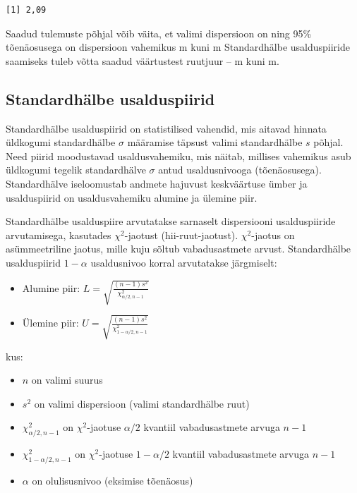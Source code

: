 \documentclass[
]{book}
\providecommand{\tightlist}{%
  \setlength{\itemsep}{0pt}\setlength{\parskip}{0pt}}
\theoremstyle{definition}
\theoremstyle{definition}
\theoremstyle{definition}
\theoremstyle{definition}
\theoremstyle{remark}
\begin{document}
\begin{verbatim}
[1] 2,09
\end{verbatim}

Saadud tulemuste põhjal võib väita, et valimi dispersioon on  ning 95\% tõenäosusega on dispersioon
vahemikus  m kuni  m Standardhälbe usalduspiiride saamiseks tuleb võtta saadud väärtustest ruutjuur --  m kuni  m.

\subsection{Standardhälbe usalduspiirid}\label{standardhuxe4lbe-usalduspiirid}

Standardhälbe usalduspiirid on statistilised vahendid, mis aitavad hinnata üldkogumi standardhälbe \(\sigma\) määramise täpsust valimi standardhälbe \(s\) põhjal. Need piirid moodustavad usaldusvahemiku, mis näitab, millises vahemikus asub üldkogumi tegelik standardhälve \(\sigma\) antud usaldusnivooga (tõenäosusega). Standardhälve iseloomustab andmete hajuvust keskväärtuse ümber ja usalduspiirid on usaldusvahemiku alumine ja ülemine piir.

Standardhälbe usalduspiire arvutatakse sarnaselt dispersiooni usalduspiiride arvutamisega, kasutades \(\chi^2\)-jaotust (hii-ruut-jaotust). \(\chi^2\)-jaotus on asümmeetriline jaotus, mille kuju sõltub vabadusastmete arvust. Standardhälbe usalduspiirid \(1-\alpha\) usaldusnivoo korral arvutatakse järgmiselt:

\begin{itemize}
\tightlist
\item
  Alumine piir: \(L = \sqrt{\frac{(n-1)s^2}{\chi^2_{\alpha/2, n-1}}}\)
\item
  Ülemine piir: \(U = \sqrt{\frac{(n-1)s^2}{\chi^2_{1-\alpha/2, n-1}}}\)
\end{itemize}

kus:

\begin{itemize}
\tightlist
\item
  \(n\) on valimi suurus
\item
  \(s^2\) on valimi dispersioon (valimi standardhälbe ruut)
\item
  \(\chi^2_{\alpha/2, n-1}\) on \(\chi^2\)-jaotuse \(\alpha/2\) kvantiil vabadusastmete arvuga \(n-1\)
\item
  \(\chi^2_{1-\alpha/2, n-1}\) on \(\chi^2\)-jaotuse \(1-\alpha/2\) kvantiil vabadusastmete arvuga \(n-1\)
\item
  \(\alpha\) on olulisusnivoo (eksimise tõenäosus)
\end{itemize}
\end{document}
